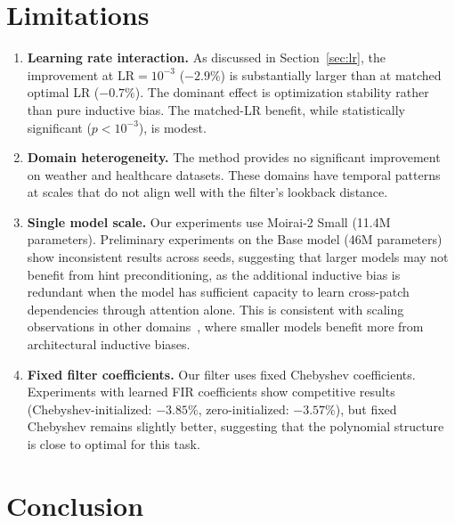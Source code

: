 \documentclass[11pt]{article}
\begin{document}
\section{Limitations}

\begin{enumerate}
    \item \textbf{Learning rate interaction.} As discussed in Section~\ref{sec:lr}, the improvement at $\text{LR}=10^{-3}$ ($-2.9\%$) is substantially larger than at matched optimal LR ($-0.7\%$). The dominant effect is optimization stability rather than pure inductive bias. The matched-LR benefit, while statistically significant ($p < 10^{-3}$), is modest.
    \item \textbf{Domain heterogeneity.} The method provides no significant improvement on weather and healthcare datasets. These domains have temporal patterns at scales that do not align well with the filter's lookback distance.
    \item \textbf{Single model scale.} Our experiments use Moirai-2 Small (11.4M parameters). Preliminary experiments on the Base model (46M parameters) show inconsistent results across seeds, suggesting that larger models may not benefit from hint preconditioning, as the additional inductive bias is redundant when the model has sufficient capacity to learn cross-patch dependencies through attention alone. This is consistent with scaling observations in other domains~\citep{kaplan2020scaling,hoffmann2022training}, where smaller models benefit more from architectural inductive biases.
    \item \textbf{Fixed filter coefficients.} Our filter uses fixed Chebyshev coefficients. Experiments with learned FIR coefficients show competitive results (Chebyshev-initialized: $-3.85\%$, zero-initialized: $-3.57\%$), but fixed Chebyshev remains slightly better, suggesting that the polynomial structure is close to optimal for this task.
\end{enumerate}

\section{Conclusion}
\end{document}
